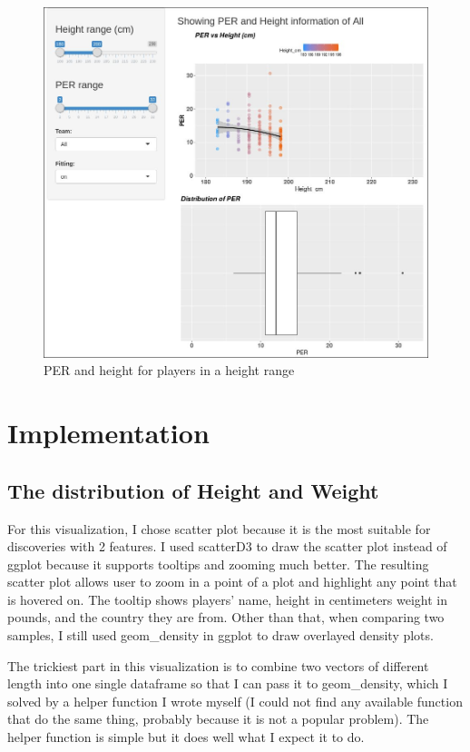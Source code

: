 \documentclass[a4paper,12pt,twoside]{article}
\numberwithin{equation}{section}
\begin{document}
\begin{figure}[h]
\caption{PER and height for players in a height range}
\includegraphics[scale=0.35]{op21.jpg}
\centering
\end{figure}


\section{Implementation}
\subsection{The distribution of Height and Weight}

For this visualization, I chose scatter plot because it is the most suitable for discoveries with 2 features. I used scatterD3 to draw the scatter plot instead of ggplot because it supports tooltips and zooming much better. The resulting scatter plot allows user to zoom in a point of a plot and highlight any point that is hovered on. The tooltip shows players' name, height in centimeters weight in pounds, and the country they are from. Other than that, when comparing two samples, I still used geom\_density in ggplot to draw overlayed density plots. 

The trickiest part in this visualization is to combine two vectors of different length into one single dataframe so that I can pass it to geom\_density, which I solved by a helper function I wrote myself (I could not find any available function that do the same thing, probably because it is not a popular problem). The helper function is simple but it does well what I expect it to do.
\end{document}
